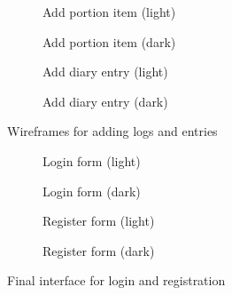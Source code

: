 \documentclass[../main.tex]{subfiles}
\begin{document}
\begin{figure}
    \centering
    \noindent\begin{subfigure}{.24\textwidth}
    \centering
    \caption{Add portion item (light)}
    \end{subfigure}\hfill
    \begin{subfigure}{.24\textwidth}
    \centering
    \caption{Add portion item (dark)}
    \end{subfigure}\hfill
    \begin{subfigure}{.24\textwidth}
    \centering
    \caption{Add diary entry (light)}
    \end{subfigure}\hfill
    \begin{subfigure}{.24\textwidth}
    \centering
    \caption{Add diary entry (dark)}
    \end{subfigure}
    \caption{Wireframes for adding logs and entries}%
\end{figure}

\begin{figure}
    \centering
    \noindent\begin{subfigure}{.24\textwidth}
    \centering
    \caption{Login form (light)}
    \end{subfigure}\hfill
    \begin{subfigure}{.24\textwidth}
    \centering
    \caption{Login form (dark)}
    \end{subfigure}\hfill
    \begin{subfigure}{.24\textwidth}
    \centering
    \caption{Register form (light)}
    \end{subfigure}\hfill
    \begin{subfigure}{.24\textwidth}
    \centering
    \caption{Register form (dark)}
    \end{subfigure}
    \caption{Final interface for login and registration}
\end{figure}
\end{document}

